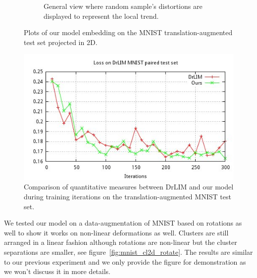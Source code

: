 \documentclass[a4paper,12pt]{report}
\begin{document}
\begin{figure}[h]
\begin{subfigure}{0.7\textwidth}
        \caption{General view where random sample's distortions are displayed to represent the local trend.}
    \end{subfigure}
    \caption{Plots of our model embedding on the MNIST translation-augmented test set projected in 2D.}
    \label{fig:mnist_cl2d}
\end{figure}

\begin{figure}[h]
    \begin{center}
        \includegraphics{thesis_figures/final_loss_test2bv7.jpg}
    \end{center}
    \caption{Comparison of quantitative measures between DrLIM and our model during training iterations on the translation-augmented MNIST test set.}
    \label{fig:loss_mnist_test_common}
\end{figure}

We tested our model on a data-augmentation of MNIST based on rotations as well to show it works on non-linear deformations as well.
Clusters are still arranged in a linear fashion although rotations are non-linear but the cluster separations are smaller, see figure~\ref{fig:mnist_cl2d_rotate}.
The results are similar to our previous experiment and we only provide the figure for demonstration as we won't discuss it in more details.
\end{document}

